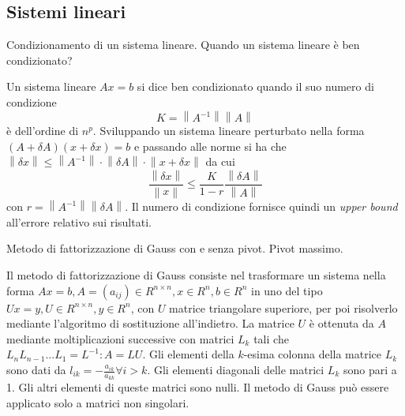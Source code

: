 \documentclass[answers, a4paper]{exam}
\newcommand{\norm}[1]{\left\lVert#1\right\rVert}
\begin{document}
\begin{questions}
\section{Sistemi lineari}
\question \label{ques:syscond} Condizionamento di un sistema lineare. Quando un sistema lineare è ben condizionato?
	\begin{solution}
		Un sistema lineare $Ax = b$ si dice ben condizionato quando il suo numero di condizione 
		\begin{equation}
			K = \norm{A^{-1}}\norm{A}
		\end{equation} è dell'ordine di $n^p$.
		Sviluppando un sistema lineare perturbato nella forma $(A + \delta A) (x + \delta x) = b$ e passando alle norme si ha che $\norm{\delta x} \leq \norm{A^{-1}}\cdot\norm{\delta A}\cdot\norm{x + \delta x}$ da cui 
	\begin{equation} \frac{\norm{\delta x}}{\norm{x}} \leq \frac{K}{1 - r} \frac{\norm{\delta A}}{\norm{A}}
	\end{equation} con $r = \norm{A^{-1}} \norm{\delta A}$. 
		Il numero di condizione fornisce quindi un \textit{upper bound} all'errore relativo sui risultati.
	\end{solution}
	\question Metodo di fattorizzazione di Gauss con e senza pivot. Pivot massimo.
	\begin{solution}
		Il metodo di fattorizzazione di Gauss consiste nel trasformare un sistema nella forma $Ax = b, A = (a_{ij}) \in R^{n\times n}, x \in R^n, b \in R^n$ in uno del tipo $U x = y, U \in R^{n\times n}, y \in R^n$, con $U$ matrice triangolare superiore, per poi risolverlo mediante l'algoritmo di sostituzione all'indietro.
		La matrice $U$ è ottenuta da $A$ mediante moltiplicazioni successive con matrici $L_k$ tali che $L_n L_{n-1} ... L_1 = L^{-1} : A = LU$.
		Gli elementi della $k$-esima colonna della matrice $L_k$ sono dati da $l_{ik} = -\frac{a_{ik}}{a_{kk}} \forall i > k$. 
		Gli elementi diagonali delle matrici $L_k$ sono pari a 1.
		Gli altri elementi di queste matrici sono nulli.
		Il metodo di Gauss può essere applicato solo a matrici non singolari.


\end{solution}
\end{questions}
\end{document}
